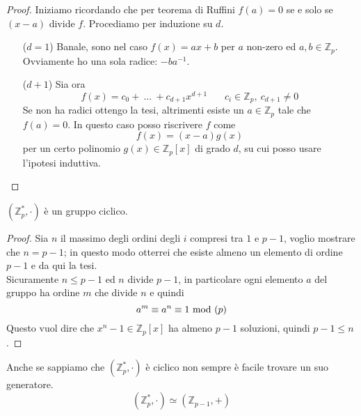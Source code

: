 \begin{proof}
	Iniziamo ricordando che per teorema di Ruffini $f(a)=0$ se e solo se $(x-a)$ divide $f$. Procediamo per induzione su $d$.
	\begin{itemize}
		\item[($d=1$)] Banale, sono nel caso $f(x)=ax+b$ per $a$ non-zero ed $a,b\in\mathbb{Z}_p$. \\ Ovviamente ho una sola radice: $-ba^{-1}$.
		\item[($d+1$)] Sia ora 
		\begin{equation*}
		f(x)=c_0+\ \dots\ +c_{d+1}x^{d+1}  \ \ \ \ \ \ \ \ c_i\in\mathbb{Z}_p,\ c_{d+1}\neq 0
		\end{equation*}
		Se non ha radici ottengo la tesi, altrimenti esiste un $a\in\mathbb{Z}_p$ tale che $f(a)=0$. In questo caso posso riscrivere $f$ come 
		\begin{equation*}
		f(x)=(x-a)g(x)
		\end{equation*}
		per un certo polinomio $g(x)\in\mathbb{Z}_p[x]$ di grado $d$, su cui posso usare l'ipotesi induttiva.
	\end{itemize}
\end{proof}
\begin{teorema}
	$\left(\mathbb{Z}_p^*,\cdot\right)$ è un gruppo ciclico.
\end{teorema}
\begin{proof}
	Sia $n$ il massimo degli ordini degli $i$ compresi tra $1$ e $p-1$, voglio mostrare che $n=p-1$; in questo modo otterrei che esiste almeno un elemento di ordine $p-1$ e da qui la tesi. \\ Sicuramente $n\leq p-1$ ed $n$ divide $p-1$, in particolare ogni elemento $a$ del gruppo ha ordine $m$ che divide $n$ e quindi
	\begin{equation*}
	a^m\equiv a^n\equiv 1\ \mathrm{mod}\ (p) 
	\end{equation*}
	Questo vuol dire che $x^n-1\in\mathbb{Z}_p[x]$ ha almeno $p-1$ soluzioni, quindi $p-1\leq n$.
\end{proof}
\begin{osservazione}
	Anche se sappiamo che $\left(\mathbb{Z}_p^*,\cdot\right)$ è ciclico non sempre è facile trovare un suo generatore. 
	\begin{equation*}
	\left(\mathbb{Z}_p^*,\cdot\right)\simeq\left(\mathbb{Z}_{p-1},+\right)
	\end{equation*}
\end{osservazione}

